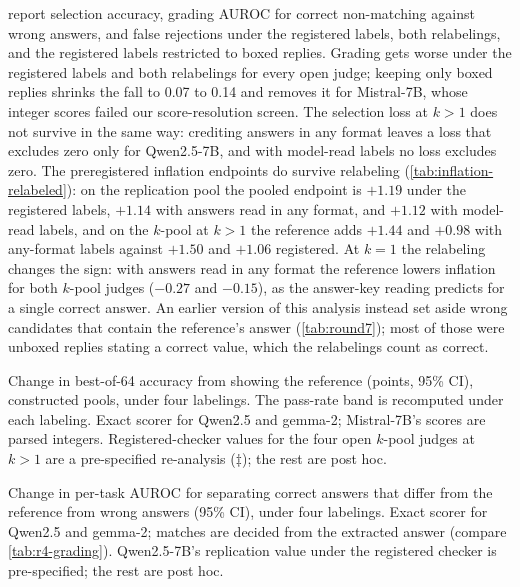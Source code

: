  report selection accuracy, grading AUROC for correct non-matching against wrong answers, and false rejections under the registered labels, both relabelings, and the registered labels restricted to boxed replies. Grading gets worse under the registered labels and both relabelings for every open judge; keeping only boxed replies shrinks the fall to 0.07 to 0.14 and removes it for Mistral-7B, whose integer scores failed our score-resolution screen. The selection loss at $k{>}1$ does not survive in the same way: crediting answers in any format leaves a loss that excludes zero only for Qwen2.5-7B, and with model-read labels no loss excludes zero. The preregistered inflation endpoints do survive relabeling (\cref{tab:inflation-relabeled}): on the replication pool the pooled endpoint is $+1.19$ under the registered labels, $+1.14$ with answers read in any format, and $+1.12$ with model-read labels, and on the $k$-pool at $k{>}1$ the reference adds $+1.44$ and $+0.98$ with any-format labels against $+1.50$ and $+1.06$ registered. At $k{=}1$ the relabeling changes the sign: with answers read in any format the reference lowers inflation for both $k$-pool judges ($-0.27$ and $-0.15$), as the answer-key reading predicts for a single correct answer. An earlier version of this analysis instead set aside wrong candidates that contain the reference's answer (\cref{tab:round7}); most of those were unboxed replies stating a correct value, which the relabelings count as correct.\ph

\begin{table}[htbp]
\centering
\caption{Change in best-of-64 accuracy from showing the reference (points, 95\% CI), constructed pools, under four labelings. The pass-rate band is recomputed under each labeling. Exact scorer for Qwen2.5 and gemma-2; Mistral-7B's scores are parsed integers. Registered-checker values for the four open $k$-pool judges at $k{>}1$ are a pre-specified re-analysis ($\ddagger$); the rest are post hoc.}
\label{tab:labelings-acc}
\footnotesize
\setlength{\tabcolsep}{3pt}
\begin{adjustbox}{max width=\linewidth}\end{adjustbox}
\end{table}

\begin{table}[htbp]
\centering
\caption{Change in per-task AUROC for separating correct answers that differ from the reference from wrong answers (95\% CI), under four labelings. Exact scorer for Qwen2.5 and gemma-2; matches are decided from the extracted answer (compare \cref{tab:r4-grading}). Qwen2.5-7B's replication value under the registered checker is pre-specified; the rest are post hoc.}
\label{tab:labelings-gnm}
\footnotesize
\setlength{\tabcolsep}{3pt}
\begin{adjustbox}{max width=\linewidth}\end{adjustbox}
\end{table}

